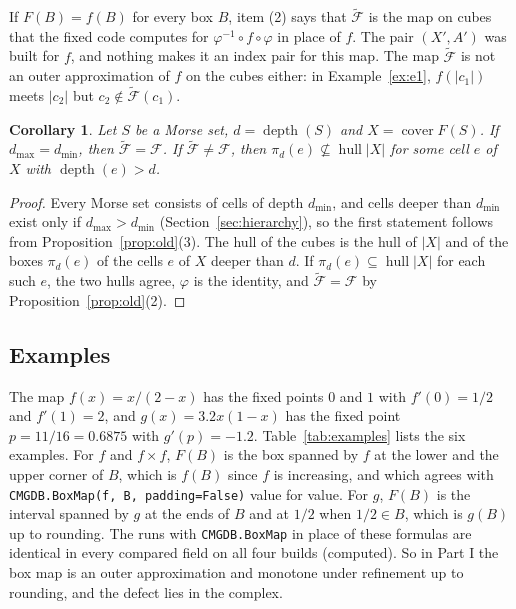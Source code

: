 \documentclass[11pt]{article}
\theoremstyle{plain}
\newtheorem{corollary}[proposition]{Corollary}
\theoremstyle{definition}
\theoremstyle{remark}
\DeclareMathOperator{\cover}{cover}
\DeclareMathOperator{\hull}{hull}
\DeclareMathOperator{\depth}{depth}
\newcommand{\Fc}{\mathcal{F}}
\newcommand{\Ft}{\tilde{\mathcal{F}}}
\newcommand{\dmin}{d_{\min}}
\newcommand{\dmax}{d_{\max}}
\newcommand{\code}[1]{\texttt{#1}}
\begin{document}
If $F(B)=f(B)$ for every box $B$, item (2) says that $\Ft$ is the map on cubes that the fixed code computes for $\varphi^{-1}\circ f\circ\varphi$ in place of $f$. The pair $(X',A')$ was built for $f$, and nothing makes it an index pair for this map. The map $\Ft$ is not an outer approximation of $f$ on the cubes either: in Example~\ref{ex:e1}, $f(|c_1|)$ meets $|c_2|$ but $c_2\notin\Ft(c_1)$.

\begin{corollary}\label{cor:scope}
Let $S$ be a Morse set, $d=\depth(S)$ and $X=\cover F(S)$. If $\dmax=\dmin$, then $\Ft=\Fc$. If $\Ft\neq\Fc$, then $\pi_d(e)\not\subseteq\hull|X|$ for some cell $e$ of $X$ with $\depth(e)>d$.
\end{corollary}

\begin{proof}
Every Morse set consists of cells of depth $\dmin$, and cells deeper than $\dmin$ exist only if $\dmax>\dmin$ (Section~\ref{sec:hierarchy}), so the first statement follows from Proposition~\ref{prop:old}(3). The hull of the cubes is the hull of $|X|$ and of the boxes $\pi_d(e)$ of the cells $e$ of $X$ deeper than $d$. If $\pi_d(e)\subseteq\hull|X|$ for each such $e$, the two hulls agree, $\varphi$ is the identity, and $\Ft=\Fc$ by Proposition~\ref{prop:old}(2).
\end{proof}

\subsection{Examples}\label{sec:examples}

The map $f(x)=x/(2-x)$ has the fixed points $0$ and $1$ with $f'(0)=1/2$ and $f'(1)=2$, and $g(x)=3.2x(1-x)$ has the fixed point $p=11/16=0.6875$ with $g'(p)=-1.2$. Table~\ref{tab:examples} lists the six examples. For $f$ and $f\times f$, $F(B)$ is the box spanned by $f$ at the lower and the upper corner of $B$, which is $f(B)$ since $f$ is increasing, and which agrees with \code{CMGDB.BoxMap(f, B, padding=False)} value for value. For $g$, $F(B)$ is the interval spanned by $g$ at the ends of $B$ and at $1/2$ when $1/2\in B$, which is $g(B)$ up to rounding. The runs with \code{CMGDB.BoxMap} in place of these formulas are identical in every compared field on all four builds (computed). So in Part I the box map is an outer approximation and monotone under refinement up to rounding, and the defect lies in the complex.
\end{document}
